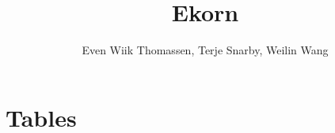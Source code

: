 \documentclass[11pt,a4paper]{article}
\title{Ekorn}
\author{Even Wiik Thomassen, Terje Snarby, Weilin Wang}
\date{\now}
\begin{document}
\section{Tables}








\end{document}
